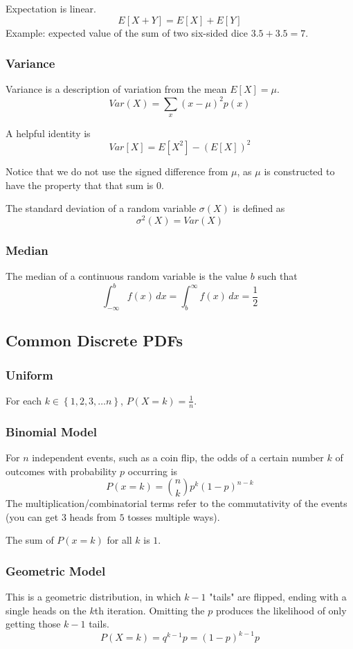 \documentclass{article}
\begin{document}
Expectation is linear. $$E\left[X+Y\right] = E\left[X\right] + E\left[Y\right]$$
Example: expected value of the sum of two six-sided dice $3.5 + 3.5 = 7$.

\subsubsection{Variance} \label{variance}
Variance is a description of variation from the mean $E[X] = \mu$.
$$Var(X) = \sum_x\left(x-\mu\right)^2p(x)$$

A helpful identity is  $$Var[X] = E[X^2] - \left(E[X]\right)^2$$

Notice that we do not use the signed difference from $\mu$, as $\mu$ is constructed to have the property that that sum is $0$.

The standard deviation of a random variable $\sigma(X)$ is defined as
$$\sigma^2(X) = Var(X)$$

\subsubsection{Median}
The median of a continuous random variable is the value $b$ such that
$$\int_{-\infty}^b f(x)\,dx = \int_b^\infty f(x)\,dx = \frac{1}{2}$$

\subsection{Common Discrete PDFs}
\subsubsection{Uniform} \label{uni}
For each $k\in\left\{1, 2, 3, \ldots n \right\}$, $P(X=k)=\frac{1}{n}$.

\subsubsection{Binomial Model}
For $n$ independent events, such as a coin flip, the odds of a certain number $k$ of outcomes with probability $p$ occurring is
$$P(x = k) = \binom{n}{k} p^k(1-p)^{n-k}$$
The multiplication/combinatorial terms refer to the commutativity of the events (you can get $3$ heads from $5$ tosses multiple ways).

The sum of $P(x=k)$ for all $k$ is $1$.

\subsubsection{Geometric Model}\label{geo}
This is a geometric distribution, in which $k-1$ "tails" are flipped, ending with a single heads on the $k$th iteration. Omitting the $p$ produces the likelihood of only getting those $k-1$ tails.
$$P(X=k)=q^{k-1}p = (1 - p)^{k-1}p$$
\end{document}
